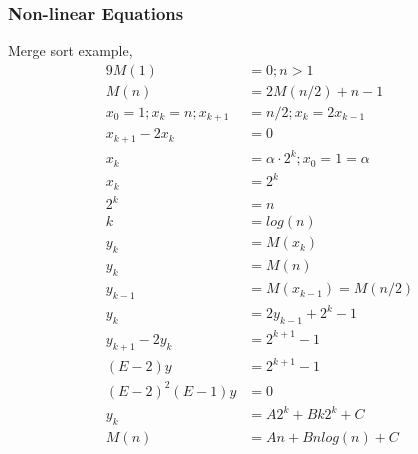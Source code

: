\subsubsection{Non-linear Equations}
Merge sort example,
\begin{alignat*}{9}
M(1) &= 0; n>1\\
M(n) &= 2M(n/2) + n - 1 \\
x_0 = 1; x_k = n; x_{k+1} &= n/2; x_k = 2x_{k-1} \\
x_{k+1} - 2x_k &= 0 \\
x_k &= \alpha \cdot 2^k; x_0 = 1 = \alpha \\
x_k &= 2^k \\
2^k &= n \\
k &= log(n) \\
y_k &= M(x_k) \\
y_k &= M(n) \\
y_{k-1} &= M(x_{k-1}) = M(n/2) \\
y_k &= 2y_{k-1} + 2^k -1 \\
y_{k+1} - 2y_k &= 2^{k+1} -1 \\
(E-2)y &= 2^{k+1} -1 \\
(E-2)^2(E-1)y &= 0 \\
y_k &= A2^k + Bk2^k + C \\
M(n) &= An + Bnlog(n) + C
\end{alignat*}

